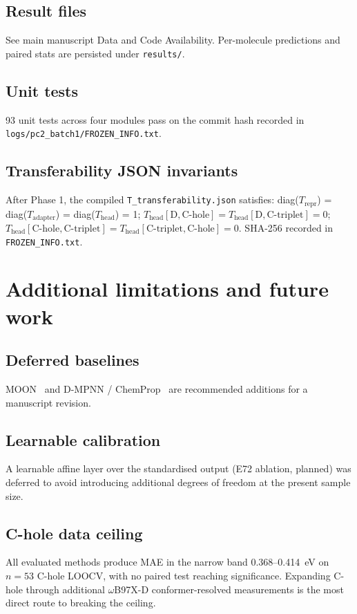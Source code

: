 \documentclass[11pt,a4paper]{article}
\begin{document}
\subsection{Result files}
See main manuscript Data and Code Availability. Per-molecule predictions and paired stats are persisted under \texttt{results/}.

\subsection{Unit tests}
93 unit tests across four modules pass on the commit hash recorded in \texttt{logs/pc2\_batch1/FROZEN\_INFO.txt}.

\subsection{Transferability JSON invariants}
After Phase 1, the compiled \texttt{T\_transferability.json} satisfies: diag($T_{\mathrm{repr}}$) = diag($T_{\mathrm{adapter}}$) = diag($T_{\mathrm{head}}$) = 1; $T_{\mathrm{head}}[\mathrm{D}, \mathrm{C\text{-}hole}] = T_{\mathrm{head}}[\mathrm{D}, \mathrm{C\text{-}triplet}] = 0$; $T_{\mathrm{head}}[\mathrm{C\text{-}hole}, \mathrm{C\text{-}triplet}] = T_{\mathrm{head}}[\mathrm{C\text{-}triplet}, \mathrm{C\text{-}hole}] = 0$. SHA-256 recorded in \texttt{FROZEN\_INFO.txt}.

\section{Additional limitations and future work}\label{si:lim}

\subsection{Deferred baselines}
MOON~\citep{Li2021_MOON} and D-MPNN / ChemProp~\citep{Yang2019_ChemProp} are recommended additions for a manuscript revision.

\subsection{Learnable calibration}
A learnable affine layer over the standardised output (E72 ablation, planned) was deferred to avoid introducing additional degrees of freedom at the present sample size.

\subsection{C-hole data ceiling}
All evaluated methods produce MAE in the narrow band \SI{0.368}{}--\SI{0.414}{\eV} on $n = 53$ C-hole LOOCV, with no paired test reaching significance. Expanding C-hole through additional $\omega$B97X-D conformer-resolved measurements is the most direct route to breaking the ceiling.
\end{document}
